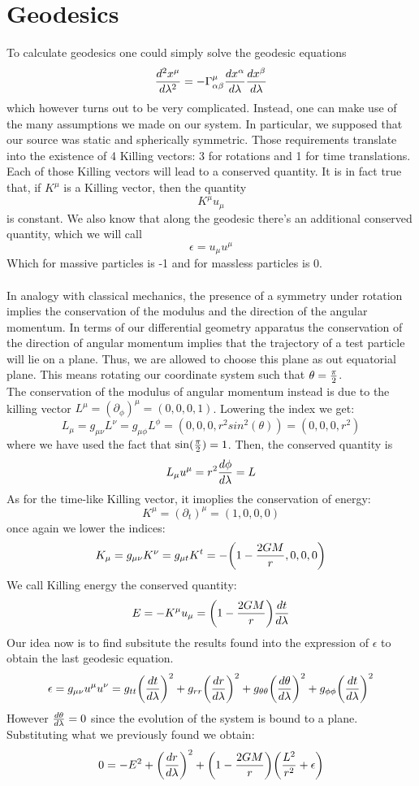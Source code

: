 \documentclass[]{article}
\theoremstyle{definition}
\theoremstyle{Theorem}
\theoremstyle{definition}
\theoremstyle{definition}
\theoremstyle{definition}
\begin{document}
\section{Geodesics}
To calculate geodesics one could simply solve the geodesic equations $${d^2x^\mu\over d\lambda^2}=-\Gamma_{\alpha\beta}^\mu{dx^\alpha\over d\lambda}{dx^\beta\over d\lambda}$$
which however turns out to be very complicated. Instead, one can make use of the many assumptions we made on our system. In particular, we supposed that our source was static and spherically symmetric. Those requirements translate into the existence of 4 Killing vectors: 3 for rotations and 1 for time translations. Each of those Killing vectors will lead to a conserved quantity. It is in fact true that, if $K^\mu$ is a Killing vector, then the quantity $$K^\mu u_\mu$$
is constant. We also know that along the geodesic there's an additional conserved quantity, which we will call
$$\epsilon=u_\mu u^\mu$$
Which for massive particles is -1 and for massless particles is 0.\\
\\
In analogy with classical mechanics, the presence of a symmetry under rotation implies the conservation of the modulus and the direction of the angular momentum. In terms of our differential geometry apparatus the conservation of the direction of angular momentum implies that the trajectory of a test particle will lie on a plane. Thus, we are allowed to choose this plane as out equatorial plane. This means rotating our coordinate system such that $\theta={\pi\over2}$.\\
The conservation of the modulus of angular momentum instead is due to the killing vector $L^\mu=(\partial_\phi)^\mu=(0,0,0,1)$. Lowering the index we get:
$$L_\mu=g_{\mu\nu}L^\nu=g_{\mu\phi}L^\phi=(0,0,0,r^2sin^2(\theta))=(0,0,0,r^2)$$
where we have used the fact that $\sin({\pi\over2})=1$.
Then, the conserved quantity is $$L_\mu u^\mu=r^2{d\phi\over d\lambda}=L$$
As for the time-like Killing vector, it imoplies the conservation of energy: 
$$K^\mu=(\partial_t)^\mu=(1,0,0,0)$$
once again we lower the indices:
$$K_\mu=g_{\mu\nu}K^\nu=g_{\mu t}K^t=-\bigg(1-{2GM\over r},0,0,0\bigg)$$
We call Killing energy the conserved quantity:
$$E=-K^\mu u_\mu=\bigg(1-{2GM\over r}\bigg){dt\over d\lambda}$$
Our idea now is to find subsitute the results found into the expression of $\epsilon$ to obtain the last geodesic equation.
$$\epsilon=g_{\mu\nu}u^\mu u^\nu=g_{tt}\bigg({dt\over d\lambda}\bigg)^2+g_{rr}\bigg({dr\over d\lambda}\bigg)^2+g_{\theta\theta}\bigg({d\theta\over d\lambda}\bigg)^2+g_{\phi\phi}\bigg({dt\over d\lambda}\bigg)^2$$
However ${d\theta\over d\lambda}=0$ since the evolution of the system is bound to a plane. Substituting what we previously found we obtain:
$$0=-E^2+\bigg({dr\over d\lambda}\bigg)^2+\bigg(1-{2GM\over r}\bigg)\bigg({L^2\over r^2}+\epsilon\bigg)$$
\end{document}
